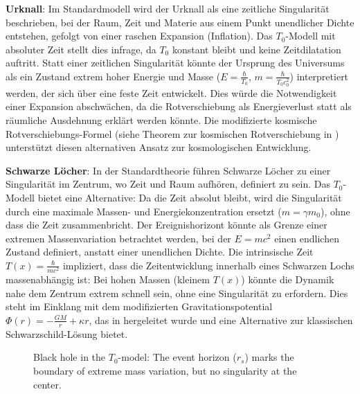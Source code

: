 \documentclass[a4paper,12pt]{article}
\newcommand{\Tfield}{T(x)}
\begin{document}
	\textbf{Urknall}: Im Standardmodell wird der Urknall als eine zeitliche Singularität beschrieben, bei der Raum, Zeit und Materie aus einem Punkt unendlicher Dichte entstehen, gefolgt von einer raschen Expansion (Inflation). Das \( T_0 \)-Modell mit absoluter Zeit stellt dies infrage, da \( T_0 \) konstant bleibt und keine Zeitdilatation auftritt. Statt einer zeitlichen Singularität könnte der Ursprung des Universums als ein Zustand extrem hoher Energie und Masse (\( E = \frac{\hbar}{T_0} \), \( m = \frac{\hbar}{T_0 c_0^2} \)) interpretiert werden, der sich über eine feste Zeit entwickelt. Dies würde die Notwendigkeit einer Expansion abschwächen, da die Rotverschiebung als Energieverlust statt als räumliche Ausdehnung erklärt werden könnte. Die modifizierte kosmische Rotverschiebungs-Formel (siehe Theorem zur kosmischen Rotverschiebung in \cite{wesentlicheFormalismen}\relax) unterstützt diesen alternativen Ansatz zur kosmologischen Entwicklung.
	
	\textbf{Schwarze Löcher}: In der Standardtheorie führen Schwarze Löcher zu einer Singularität im Zentrum, wo Zeit und Raum aufhören, definiert zu sein. Das \( T_0 \)-Modell bietet eine Alternative: Da die Zeit absolut bleibt, wird die Singularität durch eine maximale Massen- und Energiekonzentration ersetzt (\( m = \gamma m_0 \)), ohne dass die Zeit zusammenbricht. Der Ereignishorizont könnte als Grenze einer extremen Massenvariation betrachtet werden, bei der \( E = m c^2 \) einen endlichen Zustand definiert, anstatt einer unendlichen Dichte. Die intrinsische Zeit \(\Tfield = \frac{\hbar}{m c^2}\) impliziert, dass die Zeitentwicklung innerhalb eines Schwarzen Lochs massenabhängig ist: Bei hohen Massen (kleinem \(\Tfield\)) könnte die Dynamik nahe dem Zentrum extrem schnell sein, ohne eine Singularität zu erfordern. Dies steht im Einklang mit dem modifizierten Gravitationspotential \(\Phi(r) = -\frac{GM}{r} + \kappa r\), das in \cite{wesentlicheFormalismen}\relax hergeleitet wurde und eine Alternative zur klassischen Schwarzschild-Lösung bietet.
	
	\begin{figure}[h]
		\centering
		\caption{Black hole in the \( T_0 \)-model: The event horizon (\( r_s \)) marks the boundary of extreme mass variation, but no singularity at the center.}
	\end{figure}
	
\end{document}
